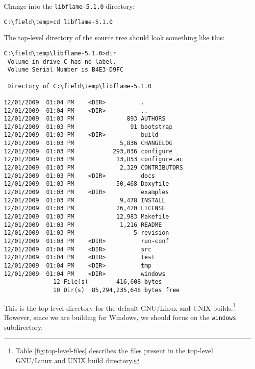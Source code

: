 \noindent
Change into the {\tt libflame-5.1.0} directory:

\begin{Verbatim}[frame=single,framesep=2.5mm,xleftmargin=5mm,fontsize=\footnotesize]
C:\field\temp>cd libflame-5.1.0
\end{Verbatim}

\noindent
The top-level directory of the source tree should look something like this:

\begin{Verbatim}[frame=single,framesep=2.5mm,xleftmargin=5mm,fontsize=\footnotesize]
C:\field\temp\libflame-5.1.0>dir
 Volume in drive C has no label.
 Volume Serial Number is B4E3-D9FC

 Directory of C:\field\temp\libflame-5.1.0

12/01/2009  01:04 PM    <DIR>          .
12/01/2009  01:04 PM    <DIR>          ..
12/01/2009  01:03 PM               893 AUTHORS
12/01/2009  01:03 PM                91 bootstrap
12/01/2009  01:03 PM    <DIR>          build
12/01/2009  01:03 PM             5,836 CHANGELOG
12/01/2009  01:03 PM           293,036 configure
12/01/2009  01:03 PM            13,853 configure.ac
12/01/2009  01:03 PM             2,329 CONTRIBUTORS
12/01/2009  01:03 PM    <DIR>          docs
12/01/2009  01:03 PM            50,468 Doxyfile
12/01/2009  01:03 PM    <DIR>          examples
12/01/2009  01:03 PM             9,478 INSTALL
12/01/2009  01:03 PM            26,420 LICENSE
12/01/2009  01:03 PM            12,983 Makefile
12/01/2009  01:03 PM             1,216 README
12/01/2009  01:03 PM                 5 revision
12/01/2009  01:03 PM    <DIR>          run-conf
12/01/2009  01:04 PM    <DIR>          src
12/01/2009  01:04 PM    <DIR>          test
12/01/2009  01:04 PM    <DIR>          tmp
12/01/2009  01:04 PM    <DIR>          windows
              12 File(s)        416,608 bytes
              10 Dir(s)  85,294,235,648 bytes free
\end{Verbatim}

\noindent
This is the top-level directory for the default GNU/Linux and UNIX
builds.\footnote{Table \ref{fig:top-level-files} describes the files present
in the top-level GNU/Linux and UNIX build directory.}
However, since we are building \libflame for Windows, we should focus on the
{\tt windows} subdirectory.

